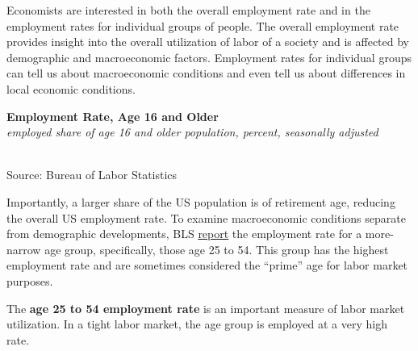 \documentclass{report}
\makeatletter
\newcommand{\tbllink}[1]{\href{https://raw.githubusercontent.com/bdecon/US-chartbook/master/chartbook/data/#1}{\faTable}}
\newcommand*\short[1]{\expandafter\@gobbletwo\number\numexpr#1\relax}
\newcommand{\dateaxisticks}{
		date coordinates in=x, axis line style={draw=none},
		xmax={2023-11-01},
		max space between ticks=40,	    
		xtick={{1990-01-01}, {1992-01-01}, {1994-01-01}, 
			{1996-01-01}, {1998-01-01}, {2000-01-01}, 
			{2002-01-01}, {2004-01-01}, {2006-01-01},
			{2008-01-01}, {2010-01-01}, {2012-01-01}, {2014-01-01},
		    {2016-01-01}, {2018-01-01}, {2020-01-01}, {2022-01-01}, 
		    {2024-01-01}, {2026-01-01}},
		minor xtick={{1989-01-01}, {1991-01-01}, {1993-01-01},
			{1995-01-01}, {1997-01-01}, {1999-01-01}, 
			{2001-01-01}, {2003-01-01}, {2005-01-01}, {2007-01-01},
		    {2009-01-01}, {2011-01-01}, {2013-01-01}, {2015-01-01},
		    {2017-01-01}, {2019-01-01}, {2021-01-01}, {2023-01-01}, 
		    {2025-01-01}, {2027-01-01}},
		enlarge y limits={0.06}, enlarge x limits={0.01},
		}
\newcommand{\stdline}[4]{\addplot[very thick, no markers, color=#1] 
		table [x=#2, y=#3, col sep=comma] {#4};	}
\newcommand{\rbars}{
		\fill[color=black!10] (axis cs:{1990-07-01},\pgfkeysvalueof{/pgfplots/ymin}) rectangle 
			(axis cs:{1991-03-01}, \pgfkeysvalueof{/pgfplots/ymax});
		\fill[color=black!10] (axis cs:{2007-12-01},\pgfkeysvalueof{/pgfplots/ymin}) rectangle 
			(axis cs:{2009-07-01}, \pgfkeysvalueof{/pgfplots/ymax});
		\fill[color=black!10] (axis cs:{2001-03-01},\pgfkeysvalueof{/pgfplots/ymin}) rectangle 
			(axis cs:{2001-11-01}, \pgfkeysvalueof{/pgfplots/ymax});
		\fill[color=black!10] (axis cs:{2020-02-01},\pgfkeysvalueof{/pgfplots/ymin}) rectangle 
			(axis cs:{2020-05-01}, \pgfkeysvalueof{/pgfplots/ymax});}
\makeatother
\begin{document}
{\begin{minipage}{0.76\textwidth}
Economists are interested in both the overall employment rate and in the employment rates for individual groups of people. The overall employment rate provides insight into the overall utilization of labor of a society and is affected by demographic and macroeconomic factors. Employment rates for individual groups can tell us about macroeconomic conditions and even tell us about differences in local economic conditions. 

 
\vspace{1mm}

\normalsize \textbf{Employment Rate, Age 16 and Older}\\
\footnotesize{\textit{employed share of age 16 and older population, percent, seasonally adjusted}}\\
\hspace*{-1mm} \\
\footnotesize{Source: Bureau of Labor Statistics} \hfill \tbllink{epop.csv}
\vspace{3mm} 

\small Importantly, a larger share of the US population is of retirement age, reducing the overall US employment rate. To examine macroeconomic conditions separate from demographic developments, BLS \href{LNS12300060}{report} the employment rate for a more-narrow age group, specifically, those age 25 to 54. This group has the highest employment rate and are sometimes considered the ``prime'' age for labor market purposes. 

The \textbf{age 25 to 54 employment rate} is an important measure of labor market utilization. In a tight labor market, the age group is employed at a very high rate.  
\vspace{1mm}


\end{minipage}}
\end{document}
